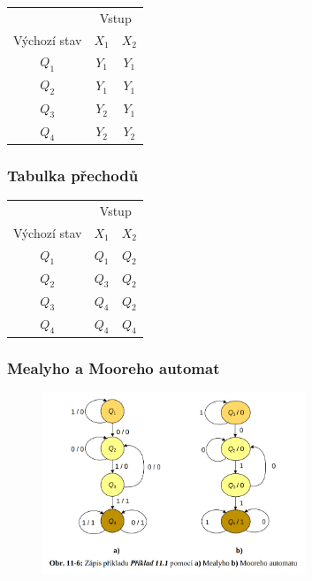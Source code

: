 \begin{table}[ht]
    \begin{tabular}{ccc}
    \hline
                 & \multicolumn{2}{c}{Vstup} \\
    Výchozí stav & $X_1$       & $X_2$       \\\hline
    $Q_1$        & $Y_1$       & $Y_1$       \\
    $Q_2$        & $Y_1$       & $Y_1$       \\
    $Q_3$        & $Y_2$       & $Y_1$       \\
    $Q_4$        & $Y_2$       & $Y_2$       \\\hline
    \end{tabular}
\end{table}

\subsubsection{Tabulka přechodů}

\begin{table}[ht]
    \begin{tabular}{ccc}
    \hline
                 & \multicolumn{2}{c}{Vstup} \\
    Výchozí stav & $X_1$       & $X_2$       \\\hline
    $Q_1$        & $Q_1$       & $Q_2$       \\
    $Q_2$        & $Q_3$       & $Q_2$       \\
    $Q_3$        & $Q_4$       & $Q_2$       \\
    $Q_4$        & $Q_4$       & $Q_4$       \\\hline
    \end{tabular}
\end{table}

\subsubsection{Mealyho a Mooreho automat}

\begin{figure}[!h]
    \centering
    \includegraphics[width=0.7\textwidth]{obrazky/100.png}
\end{figure}

